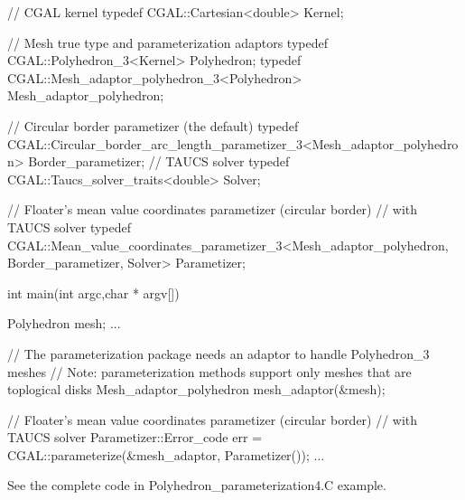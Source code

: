 \begin{ccExampleCode}

// CGAL kernel
typedef CGAL::Cartesian<double>                         Kernel;

// Mesh true type and parameterization adaptors
typedef CGAL::Polyhedron_3<Kernel>                      Polyhedron;
typedef CGAL::Mesh_adaptor_polyhedron_3<Polyhedron>     Mesh_adaptor_polyhedron;

// Circular border parametizer (the default)
typedef CGAL::Circular_border_arc_length_parametizer_3<Mesh_adaptor_polyhedron>
                                                        Border_parametizer;
// TAUCS solver
typedef CGAL::Taucs_solver_traits<double>               Solver;

// Floater's mean value coordinates parametizer (circular border)
// with TAUCS solver
typedef CGAL::Mean_value_coordinates_parametizer_3<Mesh_adaptor_polyhedron,
                                                   Border_parametizer,
                                                   Solver>
                                                        Parametizer;

int main(int argc,char * argv[])
{
    Polyhedron mesh;
    ...

    // The parameterization package needs an adaptor to handle Polyhedron_3 meshes
    // Note: parameterization methods support only meshes that are toplogical disks
    Mesh_adaptor_polyhedron mesh_adaptor(&mesh);

    // Floater's mean value coordinates parametizer (circular border)
    // with TAUCS solver
    Parametizer::Error_code err = CGAL::parameterize(&mesh_adaptor, Parametizer());
    ...
}

\end{ccExampleCode}

See the complete code in Polyhedron\_parameterization4.C example.


